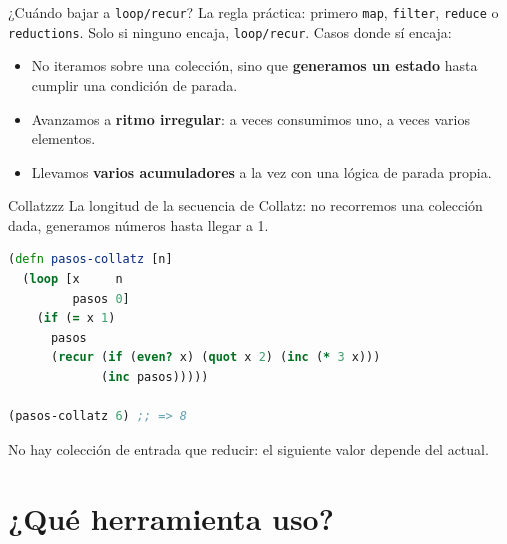 \documentclass{beamer}
\begin{document}
\begin{frame}{¿Cuándo bajar a \texttt{loop/recur}?}
    La regla práctica: primero \texttt{map}, \texttt{filter}, \texttt{reduce} o \texttt{reductions}. Solo si ninguno encaja, \texttt{loop/recur}. Casos donde sí encaja:
    \begin{itemize}
        \item No iteramos sobre una colección, sino que \textbf{generamos un estado} hasta cumplir una condición de parada.
        \item Avanzamos a \textbf{ritmo irregular}: a veces consumimos uno, a veces varios elementos.
        \item Llevamos \textbf{varios acumuladores} a la vez con una lógica de parada propia.
    \end{itemize}
\end{frame}

\begin{frame}[fragile]{Collatzzz}
    La longitud de la secuencia de Collatz: no recorremos una colección dada, generamos números hasta llegar a 1.

    \begin{lstlisting}[language=Clojure]
(defn pasos-collatz [n]
  (loop [x     n
         pasos 0]
    (if (= x 1)
      pasos
      (recur (if (even? x) (quot x 2) (inc (* 3 x)))
             (inc pasos)))))

(pasos-collatz 6) ;; => 8
    \end{lstlisting}

    No hay colección de entrada que reducir: el siguiente valor depende del actual.
\end{frame}

\section{¿Qué herramienta uso?}
\end{document}
